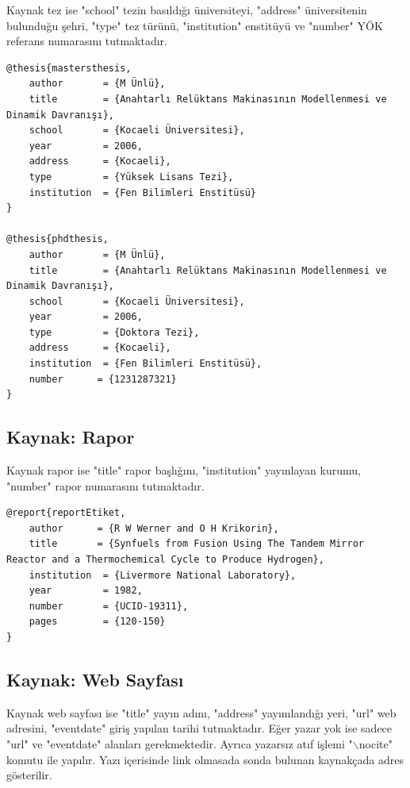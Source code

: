 Kaynak tez ise "school" tezin basıldığı üniversiteyi, "address" üniversitenin bulunduğu şehri, "type" tez türünü, "institution" enstitüyü ve "number" YÖK referans numarasını tutmaktadır.

\begin{lstlisting}[language={[LaTeX]{TeX}}, label=bib:thesis, caption=Kaynak basılmış tez ise]
@thesis{mastersthesis,
	author       = {M Ünlü}, 
	title        = {Anahtarlı Relüktans Makinasının Modellenmesi ve Dinamik	Davranışı},
	school       = {Kocaeli Üniversitesi},
	year         = 2006,
	address      = {Kocaeli},
	type		 = {Yüksek Lisans Tezi},
	institution  = {Fen Bilimleri Enstitüsü}
}

@thesis{phdthesis,
	author       = {M Ünlü}, 
	title        = {Anahtarlı Relüktans Makinasının Modellenmesi ve Dinamik	Davranışı},
	school       = {Kocaeli Üniversitesi},
	year         = 2006,
	type		 = {Doktora Tezi},
	address      = {Kocaeli},
	institution  = {Fen Bilimleri Enstitüsü},
	number		= {1231287321}
}
\end{lstlisting}


\subsection{Kaynak: Rapor}

Kaynak rapor ise "title" rapor başlığını, "institution" yayınlayan kurumu, "number" rapor numarasını tutmaktadır.

\begin{lstlisting}[language={[LaTeX]{TeX}}, label=bib:report, caption=Kaynak rapor ise]
@report{reportEtiket,
	author 		= {R W Werner and O H Krikorin},
	title 		= {Synfuels from Fusion Using The Tandem Mirror Reactor and a Thermochemical Cycle to Produce Hydrogen},
	institution  = {Livermore National Laboratory},
	year         = 1982,
	number       = {UCID-19311},
	pages		 = {120-150}
}
\end{lstlisting}

\subsection{Kaynak: Web Sayfası}

Kaynak web sayfası ise "title" yayın adını, "address" yayımlandığı yeri, "url" web adresini, "eventdate" giriş yapılan tarihi tutmaktadır. Eğer yazar yok ise sadece "url" ve "eventdate" alanları gerekmektedir. Ayrıca yazarsız atıf işlemi "$\backslash$nocite" komutu ile yapılır. Yazı içerisinde link olmasada sonda bulunan kaynakçada adres gösterilir.

